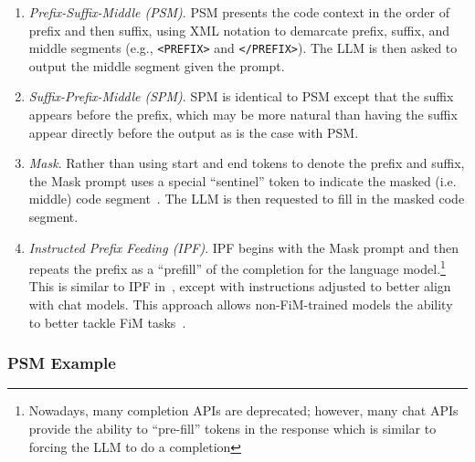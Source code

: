 \begin{enumerate}[leftmargin=*]
    \item \textit{Prefix-Suffix-Middle (PSM)}. 
    PSM presents the code context in the order of prefix and then suffix, using XML notation to demarcate prefix, suffix, and middle segments (e.g., \texttt{<PREFIX>} and \texttt{</PREFIX>}). 
    The LLM is then asked to output the middle segment given the prompt.
    \item \textit{Suffix-Prefix-Middle (SPM)}.
    SPM is identical to PSM except that the suffix appears before the prefix, which may be more natural than having the suffix appear directly before the output as is the case with PSM.
    \item \textit{Mask}. Rather than using start and end tokens to denote the prefix and suffix, the Mask prompt uses a special ``sentinel'' token to indicate the masked (i.e. middle) code segment~\citep{guo2024deepseekcoderlargelanguagemodel}.
    The LLM is then requested to fill in the masked code segment.
    \item \textit{Instructed Prefix Feeding (IPF)}.
    IPF begins with the Mask prompt and then repeats the prefix as a ``prefill'' of the completion for the language model.\footnote{Nowadays, many completion APIs are deprecated; however, many chat APIs provide the ability to ``pre-fill'' tokens in the response which is similar to forcing the LLM to do a completion}
    This is similar to IPF in~\citet{guo2024deepseekcoderlargelanguagemodel}, except with instructions adjusted to better align with chat models.
    This approach allows non-FiM-trained models the ability to better tackle FiM tasks~\citep{fried2023incodergenerativemodelcode}. 
\end{enumerate}
\newpage

\subsubsection{PSM Example}

